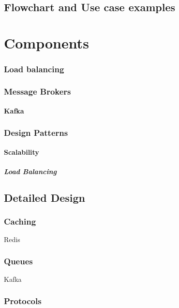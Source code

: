 \documentclass[a4paper, 11pt]{book}
\begin{document}
{    \section{Flowchart and Use case examples}


    \chapter{Components}

    \subsection{Load balancing}

    \subsection{Message Brokers}

    \subsubsection{Kafka}

    \subsection{Design Patterns}

    \subsubsection{Scalability}

    \paragraph{Load Balancing}


    \section{Detailed Design}

    \subsection{Caching}
    Redis

    \subsection{Queues}
    Kafka

    \subsection{Protocols}

}
\end{document}

